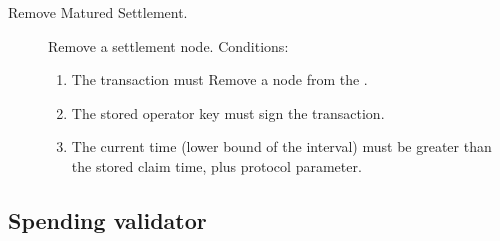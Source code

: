 \documentclass[../midgard.tex]{subfiles}
\begin{document}
\begin{description}
\begin{enumerate}
        \end{enumerate}
    \item[Remove Matured Settlement.] Remove a settlement node.
      Conditions:
        \begin{enumerate}
            \item The transaction must Remove a node from the .
            \item The stored operator key must sign the transaction.
            \item The current time (lower bound of the interval) must be greater than the stored claim time, plus  protocol parameter. 
        \end{enumerate}
\end{description}

\subsection{Spending validator}
\label{h:settlement-queue-spending-validator}
\end{document}
